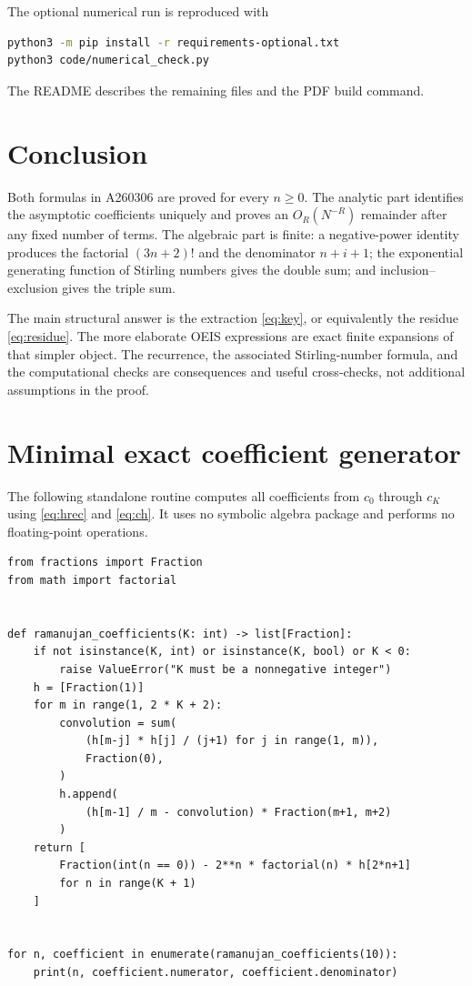 \documentclass[11pt,letterpaper]{article}
\numberwithin{equation}{section}
\theoremstyle{remark}
\begin{document}
The optional numerical run is reproduced with
\begin{lstlisting}[language=bash]
python3 -m pip install -r requirements-optional.txt
python3 code/numerical_check.py
\end{lstlisting}
The README describes the remaining files and the PDF build command.

\section{Conclusion}
\label{sec:conclusion}

Both formulas in A260306 are proved for every $n\geq0$. The analytic part
identifies the asymptotic coefficients uniquely and proves an
$O_R(N^{-R})$ remainder after any fixed number of terms. The algebraic
part is finite: a negative-power identity produces the factorial
$(3n+2)!$ and the denominator $n+i+1$; the exponential generating function
of Stirling numbers gives the double sum; and inclusion--exclusion gives
the triple sum.

The main structural answer is the extraction \eqref{eq:key}, or
equivalently the residue \eqref{eq:residue}. The more elaborate OEIS
expressions are exact finite expansions of that simpler object. The
recurrence, the associated Stirling-number formula, and the computational
checks are consequences and useful cross-checks, not additional
assumptions in the proof.

\clearpage
\appendix
\section{Minimal exact coefficient generator}
\label{app:code}

The following standalone routine computes all coefficients from $c_0$
through $c_K$ using \eqref{eq:hrec} and \eqref{eq:ch}. It uses no symbolic
algebra package and performs no floating-point operations.

\begin{lstlisting}
from fractions import Fraction
from math import factorial


def ramanujan_coefficients(K: int) -> list[Fraction]:
    if not isinstance(K, int) or isinstance(K, bool) or K < 0:
        raise ValueError("K must be a nonnegative integer")
    h = [Fraction(1)]
    for m in range(1, 2 * K + 2):
        convolution = sum(
            (h[m-j] * h[j] / (j+1) for j in range(1, m)),
            Fraction(0),
        )
        h.append(
            (h[m-1] / m - convolution) * Fraction(m+1, m+2)
        )
    return [
        Fraction(int(n == 0)) - 2**n * factorial(n) * h[2*n+1]
        for n in range(K + 1)
    ]


for n, coefficient in enumerate(ramanujan_coefficients(10)):
    print(n, coefficient.numerator, coefficient.denominator)
\end{lstlisting}
\end{document}
